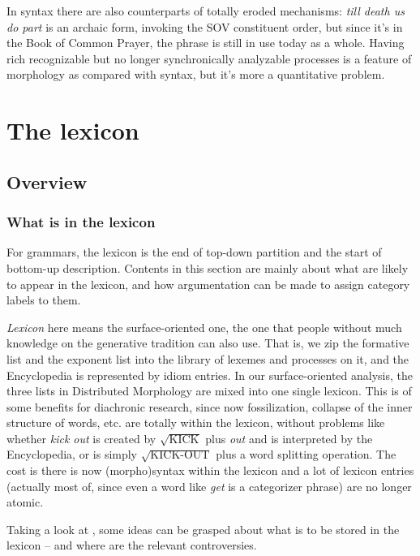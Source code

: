 \documentclass[UTF8, a4paper, oneside, scheme=plain]{ctexart}
\newcommand*{\term}[1]{\emph{#1}}
\newcommand*{\corpus}[1]{\emph{#1}}
\begin{document}
In syntax there are also counterparts of totally eroded mechanisms:
\corpus{till death us do part} is an archaic form,
invoking the SOV constituent order,
but since it's in the Book of Common Prayer,
the phrase is still in use today as a whole.
Having rich recognizable but no longer synchronically analyzable processes 
is a feature of morphology as compared with syntax,
but it's more a quantitative problem.

\section{The lexicon}\label{sec:lexicon}

\subsection{Overview}

\subsubsection{What is in the lexicon}

For grammars, the lexicon is the end of top-down partition
and the start of bottom-up description.
Contents in this section are mainly about what are likely to appear in the lexicon,
and how argumentation can be made to assign category labels to them.

\term{Lexicon} here means the surface-oriented one,
the one that people without much knowledge on the generative tradition can also use.
That is, we zip the formative list and the exponent list into 
the library of lexemes and processes on it,
and the Encyclopedia is represented by idiom entries.
In our surface-oriented analysis,
the three lists in Distributed Morphology are mixed into one single lexicon.
This is of some benefits for diachronic research,
since now fossilization, collapse of the inner structure of words, etc. 
are totally within the lexicon,
without problems like whether 
\corpus{kick out} is created by $\sqrt{\text{KICK}}$ plus \corpus{out}
and is interpreted by the Encyclopedia,
or is simply $\sqrt{\text{KICK-OUT}}$ plus a word splitting operation.
The cost is there is now (morpho)syntax within the lexicon
and a lot of lexicon entries 
(actually most of, since even a word like \corpus{get} is a categorizer phrase)
are no longer atomic.

Taking a look at ,
some ideas can be grasped about what is to be stored in the lexicon
-- and where are the relevant controversies.
\end{document}
